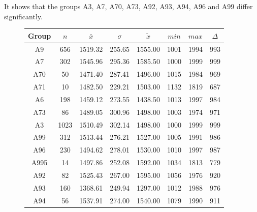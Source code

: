 It shows that the groups A3, A7, A70, A73, A92, A93, A94, A96 and A99 differ significantly.
\begin{figure}[ht!]
	\centering
	\begin{minipage}{0.5\textwidth}
		\tiny
		\setlength{\tabcolsep}{4pt}
		\centering
		\begin{tabular}{c|c|c|c|c|c|c|c}
			\toprule
			Group & $n$ & $\bar{x}$ & $\sigma$ & $\tilde{x}$ & $min$ & $max$ & $\Delta$ \\
			\midrule
			A9   & 656  & 1519.32 & 255.65 & 1555.00 & 1001 & 1994 & 993 \\ 
			A7   & 302  & 1545.96 & 295.36 & 1585.50 & 1000 & 1999 & 999 \\ 
			A70  & 50   & 1471.40 & 287.41 & 1496.00 & 1015 & 1984 & 969 \\ 
			A71  & 10   & 1482.50 & 229.21 & 1503.00 & 1132 & 1819 & 687 \\ 
			A6   & 198  & 1459.12 & 273.55 & 1438.50 & 1013 & 1997 & 984 \\ 
			A73  & 86   & 1489.05 & 300.96 & 1498.00 & 1003 & 1974 & 971 \\ 
			A3   & 1023 & 1510.49 & 302.14 & 1498.00 & 1000 & 1999 & 999 \\ 
			A99  & 312  & 1513.44 & 276.21 & 1527.00 & 1005 & 1991 & 986 \\ 
			A96  & 230  & 1494.62 & 278.01 & 1530.00 & 1010 & 1997 & 987 \\ 
			A995 & 14   & 1497.86 & 252.08 & 1592.00 & 1034 & 1813 & 779 \\ 
			A92  & 82   & 1525.43 & 267.00 & 1595.00 & 1056 & 1976 & 920 \\ 
			A93  & 160  & 1368.61 & 249.94 & 1297.00 & 1012 & 1988 & 976 \\ 
			A94  & 56   & 1537.91 & 274.00 & 1540.00 & 1079 & 1990 & 911 \\ 
			\bottomrule
		\end{tabular}
		\label{tbl:descriptives_arbis_matched_Strasse_TLCar}
	\end{minipage}%
	\begin{minipage}{0.55\textwidth}
\end{minipage}
\end{figure}
